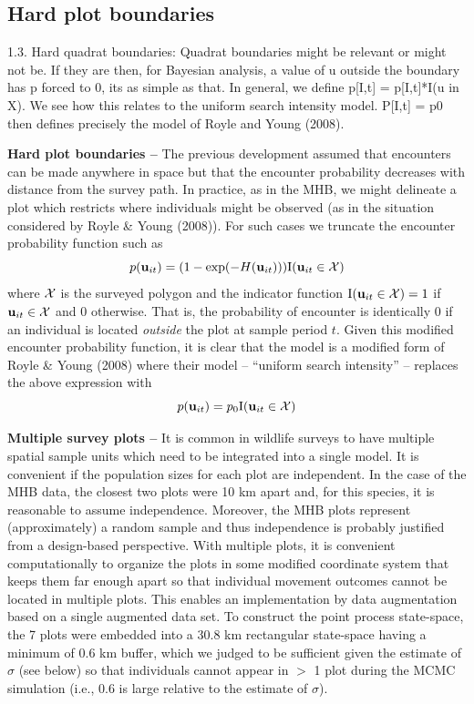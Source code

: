 \subsection{Hard plot boundaries}

1.3. Hard quadrat boundaries: Quadrat boundaries might be relevant or might not be.  If they are then, for Bayesian analysis, a value of u outside the boundary has p forced to 0, its as simple as that. 
In general, we define p[I,t] = p[I,t]*I(u in X).
We see how this relates to the uniform search intensity model.  P[I,t] = p0 then defines precisely the model of Royle and Young (2008). 


{\bf Hard plot boundaries -- } The previous development assumed that
encounters can be made anywhere in space but that the encounter
probability decreases with distance from the survey path. In practice,
as in the MHB, we might delineate a plot which restricts where
individuals might be observed (as in the situation considered by Royle
\& Young (2008)). For such cases we truncate the encounter
probability function such as
\[
p({\bf u}_{it}) = (1- \exp(-H({\bf u}_{it}))) \mbox{I}({\bf u}_{it} \in {\cal X})
\]
where ${\cal X}$ is the surveyed polygon
and the indicator function
$\mbox{I}({\bf u}_{it} \in {\cal X}) = 1$ if
${\bf u}_{it} \in {\cal X}$ and 0 otherwise.
That is, the probability of
encounter is identically 0 if an individual is located {\it outside}
the plot at sample period $t$. Given this modified encounter
probability function, it is clear that the model is a modified form of
Royle \& Young (2008) where their model -- ``uniform search
intensity'' -- replaces the above expression with
\[
p({\bf u}_{it}) = p_{0} \mbox{I}({\bf u}_{it} \in {\cal X})
\]


{\bf Multiple survey plots -- } It is common in wildlife surveys to
have multiple spatial sample units which need to be integrated into a
single model. It is convenient if the population sizes for each plot
are independent.
In the case of the MHB data, the closest two plots were 10
km apart and, for this species, it is reasonable to assume
independence. Moreover, the MHB plots represent (approximately) a
random sample and thus independence is probably justified from a
design-based perspective.  
With multiple plots, it is
convenient computationally to organize the plots in some modified
coordinate system that keeps them far enough apart so that individual
movement outcomes
cannot be located in multiple plots. This enables an
implementation by data augmentation based on a single augmented data
set.  
To construct the
point process state-space, the 7 plots were embedded into a 30.8 km
rectangular state-space having a minimum of 0.6 km buffer, which we
judged to be sufficient given the estimate of $\sigma$ (see below)
so that individuals cannot appear in $>$ 1 plot during the MCMC
simulation (i.e., $0.6$ is large
relative to the estimate of $\sigma$).



